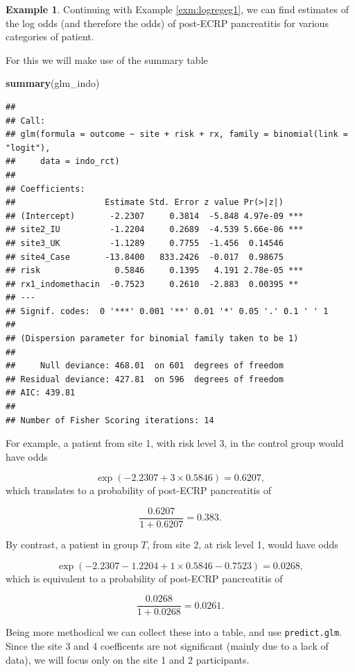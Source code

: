 \documentclass[
  openany]{book}
\newenvironment{Shaded}{\begin{snugshade}}{\end{snugshade}}
\newcommand{\FunctionTok}[1]{\textcolor[rgb]{0.13,0.29,0.53}{\textbf{#1}}}
\newcommand{\NormalTok}[1]{#1}
\theoremstyle{definition}
\theoremstyle{definition}
\newtheorem{example}{Example}[chapter]
\theoremstyle{definition}
\theoremstyle{definition}
\theoremstyle{remark}
\begin{document}
\begin{example}

Continuing with Example \ref{exm:logregeg1}, we can find estimates of the log odds (and therefore the odds) of post-ECRP pancreatitis for various categories of patient.

For this we will make use of the summary table

\begin{Shaded}
\begin{Highlighting}[]
\FunctionTok{summary}\NormalTok{(glm\_indo)}
\end{Highlighting}
\end{Shaded}

\begin{verbatim}
## 
## Call:
## glm(formula = outcome ~ site + risk + rx, family = binomial(link = "logit"), 
##     data = indo_rct)
## 
## Coefficients:
##                  Estimate Std. Error z value Pr(>|z|)    
## (Intercept)       -2.2307     0.3814  -5.848 4.97e-09 ***
## site2_IU          -1.2204     0.2689  -4.539 5.66e-06 ***
## site3_UK          -1.1289     0.7755  -1.456  0.14546    
## site4_Case       -13.8400   833.2426  -0.017  0.98675    
## risk               0.5846     0.1395   4.191 2.78e-05 ***
## rx1_indomethacin  -0.7523     0.2610  -2.883  0.00395 ** 
## ---
## Signif. codes:  0 '***' 0.001 '**' 0.01 '*' 0.05 '.' 0.1 ' ' 1
## 
## (Dispersion parameter for binomial family taken to be 1)
## 
##     Null deviance: 468.01  on 601  degrees of freedom
## Residual deviance: 427.81  on 596  degrees of freedom
## AIC: 439.81
## 
## Number of Fisher Scoring iterations: 14
\end{verbatim}

For example, a patient from site 1, with risk level 3, in the control group would have odds

\[\exp\left(-2.2307 + 3\times 0.5846\right) = 0.6207, \]
which translates to a probability of post-ECRP pancreatitis of

\[\frac{0.6207}{1+0.6207} = 0.383. \]

By contrast, a patient in group \(T\), from site 2, at risk level 1, would have odds

\[\exp\left(-2.2307 - 1.2204 + 1\times 0.5846 - 0.7523\right) = 0.0268, \]
which is equivalent to a probability of post-ECRP pancreatitis of

\[\frac{0.0268}{1+0.0268} = 0.0261.\]

Being more methodical we can collect these into a table, and use \texttt{predict.glm}. Since the site 3 and 4 coefficents are not significant (mainly due to a lack of data), we will focus only on the site 1 and 2 participants.


\end{example}
\end{document}
